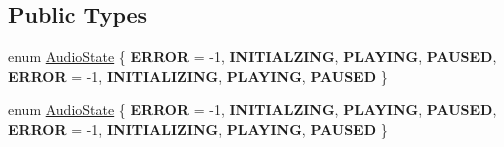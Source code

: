 \subsection*{Public Types}
\begin{DoxyCompactItemize}
\item 
enum \hyperlink{classexperimental_1_1AudioEngine_ab7becf9cab1f5e4cac089a1f6e3785e6}{Audio\+State} \{ \newline
{\bfseries E\+R\+R\+OR} = -\/1, 
{\bfseries I\+N\+I\+T\+I\+A\+L\+Z\+I\+NG}, 
{\bfseries P\+L\+A\+Y\+I\+NG}, 
{\bfseries P\+A\+U\+S\+ED}, 
\newline
{\bfseries E\+R\+R\+OR} = -\/1, 
{\bfseries I\+N\+I\+T\+I\+A\+L\+I\+Z\+I\+NG}, 
{\bfseries P\+L\+A\+Y\+I\+NG}, 
{\bfseries P\+A\+U\+S\+ED}
 \}
\item 
enum \hyperlink{classexperimental_1_1AudioEngine_ab7becf9cab1f5e4cac089a1f6e3785e6}{Audio\+State} \{ \newline
{\bfseries E\+R\+R\+OR} = -\/1, 
{\bfseries I\+N\+I\+T\+I\+A\+L\+Z\+I\+NG}, 
{\bfseries P\+L\+A\+Y\+I\+NG}, 
{\bfseries P\+A\+U\+S\+ED}, 
\newline
{\bfseries E\+R\+R\+OR} = -\/1, 
{\bfseries I\+N\+I\+T\+I\+A\+L\+I\+Z\+I\+NG}, 
{\bfseries P\+L\+A\+Y\+I\+NG}, 
{\bfseries P\+A\+U\+S\+ED}
 \}
\end{DoxyCompactItemize}
